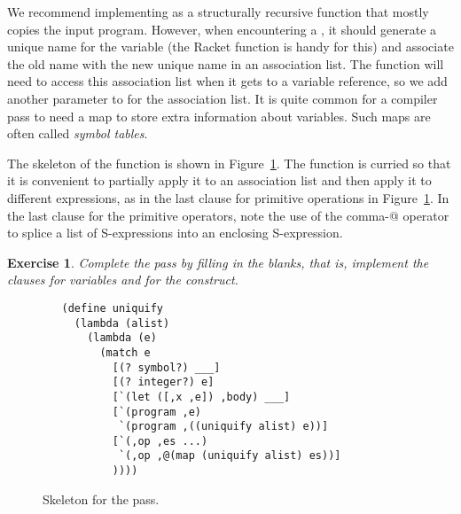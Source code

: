 \documentclass[11pt]{book}
\newtheorem{exercise}[theorem]{Exercise}
\begin{document}
We recommend implementing  as a structurally recursive
function that mostly copies the input program. However, when
encountering a , it should generate a unique name for the
variable (the Racket function  is handy for this) and
associate the old name with the new unique name in an association
list. The  function will need to access this
association list when it gets to a variable reference, so we add
another parameter to  for the association list. It is
quite common for a compiler pass to need a map to store extra
information about variables. Such maps are often called \emph{symbol
  tables}.

The skeleton of the  function is shown in
Figure~\ref{fig:uniquify-s0}.  The function is curried so that it is
convenient to partially apply it to an association list and then apply
it to different expressions, as in the last clause for primitive
operations in Figure~\ref{fig:uniquify-s0}. In the last 
clause for the primitive operators, note the use of the comma-@
operator to splice a list of S-expressions into an enclosing
S-expression.

\begin{exercise}
\normalfont %

Complete the  pass by filling in the blanks, that is,
implement the clauses for variables and for the  construct.
\end{exercise}

\begin{figure}[tbp]
\begin{lstlisting}
   (define uniquify
     (lambda (alist)
       (lambda (e)
         (match e
           [(? symbol?) ___]
           [(? integer?) e]
           [`(let ([,x ,e]) ,body) ___]
           [`(program ,e)
            `(program ,((uniquify alist) e))]
           [`(,op ,es ...)
            `(,op ,@(map (uniquify alist) es))]
           ))))
\end{lstlisting}
\caption{Skeleton for the  pass.}
\label{fig:uniquify-s0}
\end{figure}
\end{document}
